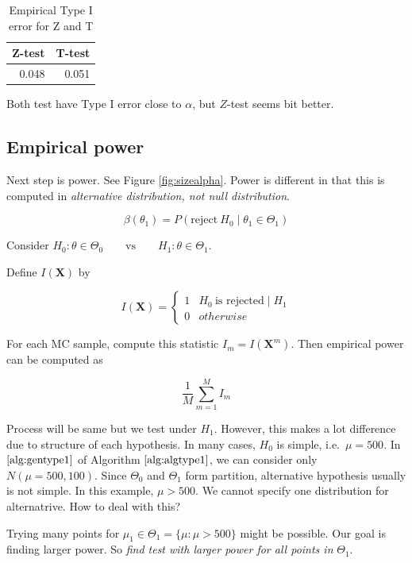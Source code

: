 \documentclass[]{book}
\theoremstyle{definition}
\theoremstyle{definition}
\theoremstyle{definition}
\theoremstyle{remark}
\let\BeginKnitrBlock\begin \let\EndKnitrBlock\end
\begin{document}
\begin{table}[t]

\caption{\label{tab:errmc}Empirical Type I error for Z and T}
\centering
\begin{tabular}{r|r}
\hline
Z-test & T-test\\
\hline
0.048 & 0.051\\
\hline
\end{tabular}
\end{table}

Both test have Type I error close to \(\alpha\), but \(Z\)-test seems bit better.

\hypertarget{empirical-power}{%
\subsection{Empirical power}\label{empirical-power}}

Next step is power. See Figure \ref{fig:sizealpha}. Power is different in that this is computed in \emph{alternative distribution, not null distribution}.

\[\beta(\theta_1) = P(\text{reject}\: H_0 \mid \theta_1 \in \Theta_1)\]

\BeginKnitrBlock{lemma}
\protect\hypertarget{lem:testalt}{}{\label{lem:testalt} }Consider \(H_0: \theta \in \Theta_0 \qquad \text{vs} \qquad H_1: \theta \in \Theta_1\).

Define \(I(\mathbf{X})\) by

\[
I(\mathbf{X}) = \begin{cases}
  1 & H_0 \:\text{is rejected} \mid H_1 \\
  0 & otherwise
\end{cases}
\]

For each MC sample, compute this statistic \(I_m = I(\mathbf{X}^{m})\). Then empirical power can be computed as

\[\frac{1}{M}\sum_{m = 1}^M I_m\]
\EndKnitrBlock{lemma}

Process will be same but we test under \(H_1\). However, this makes a lot difference due to structure of each hypothesis. In many cases, \(H_0\) is simple, i.e.~\(\mu = 500\). In \(\ref{alg:gentype1}\) of Algorithm \(\ref{alg:algtype1}\), we can consider only \(N(\mu = 500, 100)\). Since \(\Theta_0\) and \(\Theta_1\) form partition, alternative hypothesis usually is not simple. In this example, \(\mu > 500\). We cannot specify one distribution for alternatrive. How to deal with this?

Trying many points for \(\mu_1 \in \Theta_1 = \{ \mu : \mu > 500 \}\) might be possible. Our goal is finding larger power. So \emph{find test with larger power for all points in} \(\Theta_1\).
\end{document}
